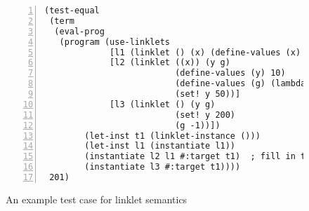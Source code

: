 \begin{figure}[!h]
\centering

\begin{minipage}{0.8\textwidth}
\begin{lstlisting}[language=racket,
                basicstyle=\ttfamily\footnotesize,
                numbers=left, xleftmargin=2em, numberstyle=\tiny]
(test-equal
 (term
  (eval-prog
   (program (use-linklets
             [l1 (linklet () (x) (define-values (x) 1))]
             [l2 (linklet ((x)) (y g)
                          (define-values (y) 10)
                          (define-values (g) (lambda (p) (+ x y)))
                          (set! y 50))]
             [l3 (linklet () (y g)
                          (set! y 200)
                          (g -1))])
        (let-inst t1 (linklet-instance ()))
        (let-inst l1 (instantiate l1))
        (instantiate l2 l1 #:target t1)  ; fill in the target
        (instantiate l3 #:target t1))))
 201)
\end{lstlisting}
\caption{An example test case for linklet semantics}
\label{fig:test-equal-listing}
\end{minipage}
\end{figure}